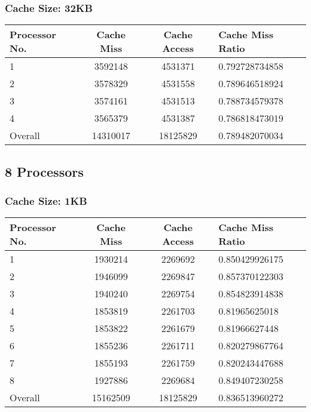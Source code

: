 \documentclass[]{article}
\begin{document}
\subsubsection{Cache Size: 32KB}
\begin{tabularx}{\textwidth}{ | l | c | c | X | }
\hline
Processor No.    & Cache Miss    & Cache Access  &   Cache Miss Ratio \\
\hline
1    & 3592148  & 4531371    & 0.792728734858 \\
\hline
2    & 3578329  & 4531558    & 0.789646518924 \\
\hline
3    & 3574161  & 4531513    & 0.788734579378 \\
\hline
4    & 3565379  & 4531387    & 0.786818473019 \\
\hline
Overall & 14310017    & 18125829  & 0.789482070034 \\
\hline
\end{tabularx}
\pagebreak


\subsection{8 Processors}
\subsubsection{Cache Size: 1KB}
\begin{tabularx}{\textwidth}{ | l | c | c | X | }
\hline
Processor No.    & Cache Miss    & Cache Access  &   Cache Miss Ratio \\
\hline
1    & 1930214  & 2269692    & 0.850429926175 \\
\hline
2    & 1946099  & 2269847    & 0.857370122303 \\
\hline
3    & 1940240  & 2269754    & 0.854823914838 \\
\hline
4    & 1853819  & 2261703    & 0.81965625018 \\
\hline
5    & 1853822  & 2261679    & 0.81966627448 \\
\hline
6    & 1855236  & 2261711    & 0.820279867764 \\
\hline
7    & 1855193  & 2261759    & 0.820243447688 \\
\hline
8    & 1927886  & 2269684    & 0.849407230258 \\
\hline
Overall & 15162509    & 18125829  & 0.836513960272 \\
\hline
\end{tabularx}
\end{document}
